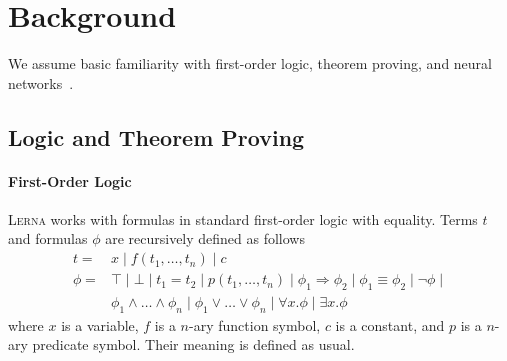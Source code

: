 \documentclass{llncs}
\newcommand{\lerna}{\textsc{Lerna}}
\begin{document}
\section{Background}

We assume basic familiarity with first-order logic, theorem proving, and  neural networks~\cite{neural-survey}.

\subsection{Logic and Theorem Proving}

\paragraph{First-Order Logic}

\lerna{} works with formulas in standard first-order logic with equality. Terms $t$ and formulas $\phi$ are recursively defined as follows
\[
\begin{array}{ll}
t = & x \mid f\left(t_1, \ldots, t_n\right) \mid c \\
\phi  =  & \top \mid \bot \mid t_1 = t_2 \mid p\left(t_1, \ldots, t_n\right) \mid \phi_1 \Rightarrow \phi_2 \mid \phi_1 \equiv \phi_2\mid \neg \phi \mid \\ &   \phi_1 \wedge \ldots \wedge \phi_n \mid \phi_1  \vee \ldots \vee \phi_n \mid \forall x. \phi \mid \exists x. \phi
\end{array}
\]
where $x$ is a variable, $f$ is a $n$-ary function symbol, $c$ is a constant, and $p$ is a $n$-ary predicate symbol. Their meaning is defined as usual.

\end{document}
